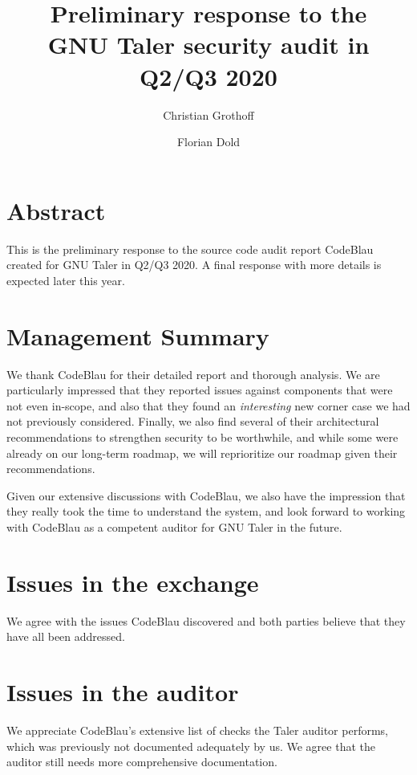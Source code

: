 \documentclass[11pt]{article}
\begin{document}
\pagestyle{headings}
\title{Preliminary response to the \\ GNU Taler security audit in Q2/Q3 2020}
\author{Christian Grothoff \and Florian Dold}

\maketitle

\section{Abstract}

This is the preliminary response to the source code audit report CodeBlau
created for GNU Taler in Q2/Q3 2020.  A final response with more details is
expected later this year.

\section{Management Summary}

We thank CodeBlau for their detailed report and thorough analysis. We are
particularly impressed that they reported issues against components that were
not even in-scope, and also that they found an {\em interesting} new corner
case we had not previously considered. Finally, we also find several of their
architectural recommendations to strengthen security to be worthwhile, and
while some were already on our long-term roadmap, we will reprioritize our
roadmap given their recommendations.

Given our extensive discussions with CodeBlau, we also have the impression
that they really took the time to understand the system, and look forward
to working with CodeBlau as a competent auditor for GNU Taler in the future.

\section{Issues in the exchange}

We agree with the issues CodeBlau discovered and both parties believe that
they have all been addressed.

\section{Issues in the auditor}

We appreciate CodeBlau's extensive list of checks the Taler auditor performs,
which was previously not documented adequately by us. We agree that the
auditor still needs more comprehensive documentation.
\end{document}
